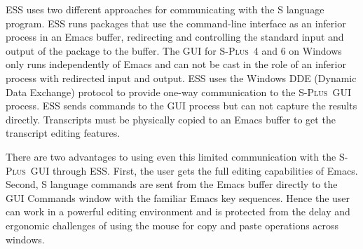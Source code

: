 \documentclass{article}
\newcommand*{\Splus}{\textsc{S-Plus}}
\newcommand{\stexttt}[1]{{\small\texttt{#1}}}
\newenvironment{Comment}{\begin{quote}\small\itshape }{\end{quote}}
\begin{document}
ESS uses two different approaches for communicating with the S
language program.  ESS runs packages that use the command-line interface
as an inferior process in an Emacs buffer,
redirecting and controlling the standard input and output of the
package to the buffer.
The GUI for \Splus\ 4 and 6 on Windows only runs independently of
Emacs and can not be cast in the role of an inferior process with
redirected input and output.
ESS uses the Windows DDE (Dynamic Data Exchange) protocol to provide 
one-way communication to the \Splus\ GUI process.  ESS sends commands
to the GUI process but can not capture
the results directly.
Transcripts must be physically copied to an Emacs buffer to get the
transcript editing features.

There are two %
advantages to using even this limited communication with the \Splus\ 
GUI through ESS.  First, the user gets the full editing capabilities
of Emacs.  Second, S language commands are sent from the Emacs buffer
directly to the GUI Commands window with the familiar Emacs
key sequences.  Hence the user can work in a powerful editing environment
and is protected from the delay and ergonomic challenges of using the
mouse for copy and paste operations across windows.
\end{document}
